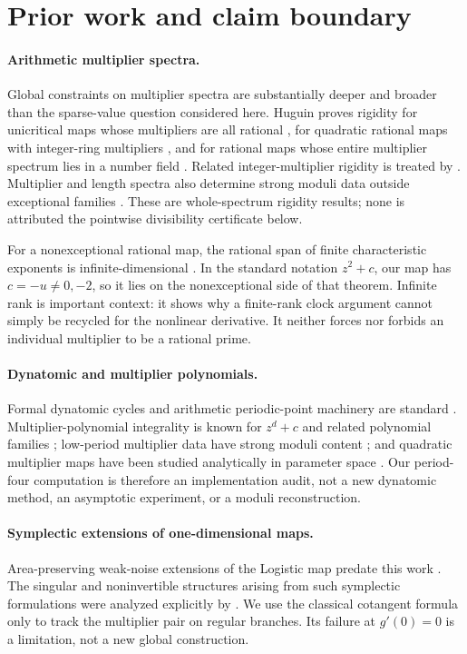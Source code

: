 \documentclass[11pt]{article}
\theoremstyle{remark}
\begin{document}
\section{Prior work and claim boundary}
\label{sec:prior}

\paragraph{Arithmetic multiplier spectra.}
Global constraints on multiplier spectra are substantially deeper and broader
than the sparse-value question considered here.  Huguin proves rigidity for
unicritical maps whose multipliers are all rational
\citep{huguin2021unicritical}, for quadratic rational maps with integer-ring
multipliers \citep{huguin2022quadratic}, and for rational maps whose entire
multiplier spectrum lies in a number field \citep{huguin2023rational}.
Related integer-multiplier rigidity is treated by
\citet{buff2022integer}.  Multiplier and length spectra also determine strong
moduli data outside exceptional families \citep{jixie2023homoclinic}.
These are whole-spectrum rigidity results; none is attributed the pointwise
divisibility certificate below.

For a nonexceptional rational map, the rational span of finite characteristic
exponents is infinite-dimensional \citep{jixiezhang2026space}.  In the
standard notation \(z^2+c\), our map has \(c=-u\ne0,-2\), so it lies on the
nonexceptional side of that theorem.  Infinite rank is important context: it
shows why a finite-rank clock argument cannot simply be recycled for the
nonlinear derivative.  It neither forces nor forbids an individual multiplier
to be a rational prime.

\paragraph{Dynatomic and multiplier polynomials.}
Formal dynatomic cycles and arithmetic periodic-point machinery are standard
\citep{morton1994rational,silverman2007arithmetic}.  Multiplier-polynomial
integrality is known for \(z^d+c\) and related polynomial families
\citep{murakami2024arithmetic}; low-period multiplier data have strong moduli
content \citep{huguin2024moduli}; and quadratic multiplier maps have been
studied analytically in parameter space \citep{levin2009multipliers}.  Our
period-four computation is therefore an implementation audit, not a new
dynatomic method, an asymptotic experiment, or a moduli reconstruction.

\paragraph{Symplectic extensions of one-dimensional maps.}
Area-preserving weak-noise extensions of the Logistic map predate this work
\citep{fogedby2005weak}.  The singular and noninvertible structures arising
from such symplectic formulations were analyzed explicitly by
\citet{demaeyer2009escape}.  We use the classical cotangent formula only to
track the multiplier pair on regular branches.  Its failure at \(g'(0)=0\)
is a limitation, not a new global construction.
\end{document}
